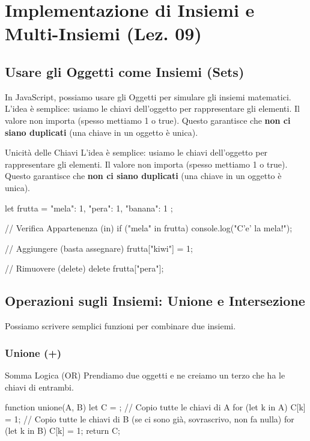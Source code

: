 \section{Implementazione di Insiemi e Multi-Insiemi (Lez. 09)}

\subsection{Usare gli Oggetti come Insiemi (Sets)}
In JavaScript, possiamo usare gli Oggetti per simulare gli insiemi matematici.
L'idea è semplice: usiamo le chiavi dell'oggetto per rappresentare gli elementi. Il valore non importa (spesso mettiamo 1 o true).
Questo garantisce che \textbf{non ci siano duplicati} (una chiave in un oggetto è unica).

\begin{concept}{Unicità delle Chiavi}
L'idea è semplice: usiamo le chiavi dell'oggetto per rappresentare gli elementi. Il valore non importa (spesso mettiamo 1 o true).
Questo garantisce che \textbf{non ci siano duplicati} (una chiave in un oggetto è unica).
\end{concept}
\begin{jsbox}
let frutta = {
    "mela": 1,
    "pera": 1,
    "banana": 1
};

// Verifica Appartenenza (in)
if ("mela" in frutta) {
    console.log("C'e' la mela!");
}

// Aggiungere (basta assegnare)
frutta["kiwi"] = 1;

// Rimuovere (delete)
delete frutta["pera"];
\end{jsbox}

\subsection{Operazioni sugli Insiemi: Unione e Intersezione}
Possiamo scrivere semplici funzioni per combinare due insiemi.

\subsubsection{Unione (+)}
\begin{concept}{Somma Logica (OR)}
Prendiamo due oggetti e ne creiamo un terzo che ha le chiavi di entrambi.
\end{concept}
\begin{jsbox}
function unione(A, B) {
    let C = {};
    // Copio tutte le chiavi di A
    for (let k in A) C[k] = 1;
    // Copio tutte le chiavi di B (se ci sono già, sovrascrivo, non fa nulla)
    for (let k in B) C[k] = 1;
    return C;
}
\end{jsbox}

